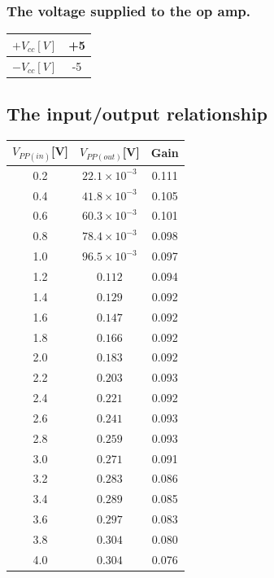 \documentclass[12pt]{article}
\begin{document}
\subsubsection{The voltage supplied to the op amp.}
\begin{table}[H]
\centering
\begin{tabular}{|c|c|}
\hline
$+V_{cc}[V]$       &+5      \\ \hline
$-V_{cc}[V]$        &-5    \\ \hline
\end{tabular}
\end{table}
\subsection{The input/output relationship}
\begin{table}[H]
\centering
\begin{tabular}{|c|c|c|}
\hline
$V_{PP(in)}$[V]    &$V_{PP(out)}$[V] &Gain   \\ \hline
0.2 &$22.1\times 10^{-3}$&0.111  \\ \hline
0.4 &$41.8\times 10^{-3}$&0.105  \\ \hline
0.6 &$60.3\times 10^{-3}$&0.101  \\ \hline
0.8 &$78.4\times 10^{-3}$&0.098  \\ \hline
1.0 &$96.5\times 10^{-3}$&0.097  \\ \hline
1.2 &$0.112$&0.094  \\ \hline
1.4 &$0.129$&0.092  \\ \hline
1.6 &$0.147$&0.092  \\ \hline
1.8 &$0.166$&0.092  \\ \hline
2.0 &$0.183$&0.092 \\ \hline
2.2 &$0.203$&0.093  \\ \hline
2.4 &$0.221$&0.092 \\ \hline
2.6 &$0.241$&0.093  \\ \hline
2.8 &$0.259$&0.093  \\ \hline
3.0 &$0.271$&0.091  \\ \hline
3.2 &$0.283$&0.086  \\ \hline
3.4 &$0.289$&0.085	  \\ \hline
3.6 &$0.297$&0.083  \\ \hline
3.8&$0.304$&0.080 \\ \hline
4.0 &$0.304$&0.076	  \\ \hline
\end{tabular}
\end{table}
\end{document}

